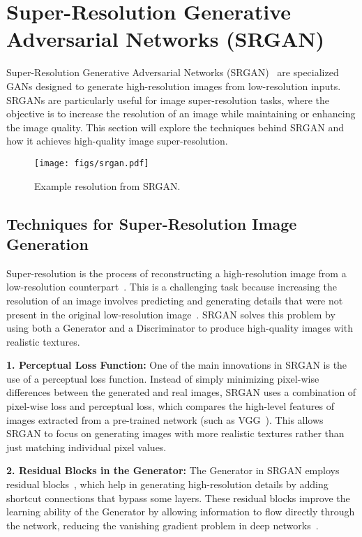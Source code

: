 \section{Super-Resolution Generative Adversarial Networks (SRGAN)}
Super-Resolution Generative Adversarial Networks (SRGAN)~\cite{ledig2016photo} are specialized GANs designed to generate high-resolution images from low-resolution inputs. SRGANs are particularly useful for image super-resolution tasks, where the objective is to increase the resolution of an image while maintaining or enhancing the image quality. This section will explore the techniques behind SRGAN and how it achieves high-quality image super-resolution.

\begin{figure}[htbp]
    \centering
    \texttt{[image: figs/srgan.pdf]}
    \caption{Example resolution from SRGAN.}
\end{figure}

\subsection{Techniques for Super-Resolution Image Generation}
Super-resolution is the process of reconstructing a high-resolution image from a low-resolution counterpart~\cite{ledig2016photo}. This is a challenging task because increasing the resolution of an image involves predicting and generating details that were not present in the original low-resolution image~\cite{xiong2020improved}. SRGAN solves this problem by using both a Generator and a Discriminator to produce high-quality images with realistic textures.

\textbf{1. Perceptual Loss Function:}  
One of the main innovations in SRGAN is the use of a perceptual loss function. Instead of simply minimizing pixel-wise differences between the generated and real images, SRGAN uses a combination of pixel-wise loss and perceptual loss, which compares the high-level features of images extracted from a pre-trained network (such as VGG~\cite{simonyan2014very}). This allows SRGAN to focus on generating images with more realistic textures rather than just matching individual pixel values.

\textbf{2. Residual Blocks in the Generator:}  
The Generator in SRGAN employs residual blocks~\cite{he2016deep}, which help in generating high-resolution details by adding shortcut connections that bypass some layers. These residual blocks improve the learning ability of the Generator by allowing information to flow directly through the network, reducing the vanishing gradient problem in deep networks~\cite{vaswani2017attention, he2016deep}.

